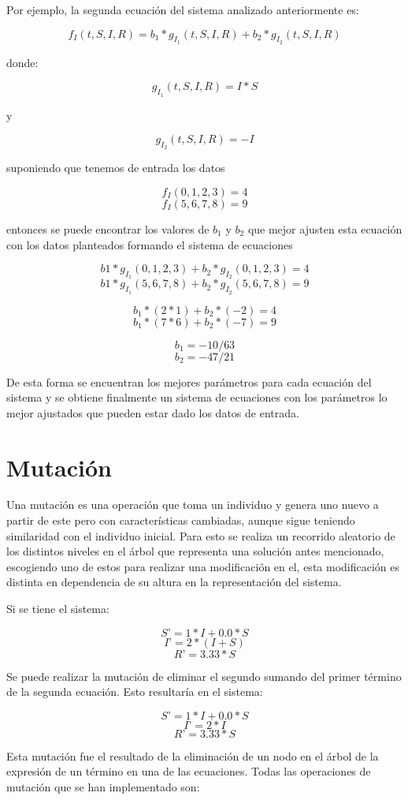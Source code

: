 Por ejemplo, la segunda ecuación del sistema analizado anteriormente es:

$$f_I (t,S,I,R) = b_1 * g_{I_1} (t,S,I,R) + b_2 * g_{I_2} (t,S,I,R)$$

donde:

$$g_{I_1}(t,S,I,R) = I*S$$

y

$$g_{I_2}(t,S,I,R) = -I$$

suponiendo que tenemos de entrada los datos

$$f_I(0, 1, 2, 3) = 4$$
$$f_I(5, 6, 7, 8) = 9$$

entonces se puede encontrar los valores de $b_1$ y $b_2$ que mejor ajusten esta ecuación con los datos planteados formando el sistema de ecuaciones

$$b1 * g_{I_1}(0, 1, 2, 3) + b_2 * g_{I_2}(0, 1, 2, 3) = 4$$
$$b1 * g_{I_1}(5, 6, 7, 8) + b_2 * g_{I_2}(5, 6, 7, 8) = 9$$

$$b_1 * (2 * 1) + b_2 * (- 2) = 4$$
$$b_1 * (7 * 6) + b_2 * (- 7) = 9$$

$$b_1 = -10/63$$
$$b_2 = -47/21$$

De esta forma se encuentran los mejores parámetros para cada ecuación del sistema y se obtiene finalmente un sistema de ecuaciones con los parámetros lo mejor ajustados que pueden estar dado los datos de entrada.

\section{Mutación}

Una mutación es una operación que toma un individuo y genera uno nuevo a partir de este pero con características cambiadas, aunque sigue teniendo similaridad con el individuo inicial. Para esto se realiza un recorrido aleatorio de los distintos niveles en el árbol que representa una solución antes mencionado, escogiendo uno de estos para realizar una modificación en el, esta modificación es distinta en dependencia de su altura en la representación del sistema.

Si se tiene el sistema:

$$S’ = 1 * I + 0.0 * S$$
$$I’ = 2 * (I + S)$$
$$R’ = 3.33 * S$$

Se puede realizar la mutación de eliminar el segundo sumando del primer término de la segunda ecuación. Esto resultaría en el sistema:

$$S’ = 1 * I + 0.0 * S$$
$$I’ = 2 * I$$
$$R’ = 3.33 * S$$

Esta mutación fue el resultado de la eliminación de un nodo en el árbol de la expresión de un término en una de las ecuaciones. Todas las operaciones de mutación que se han implementado son:

